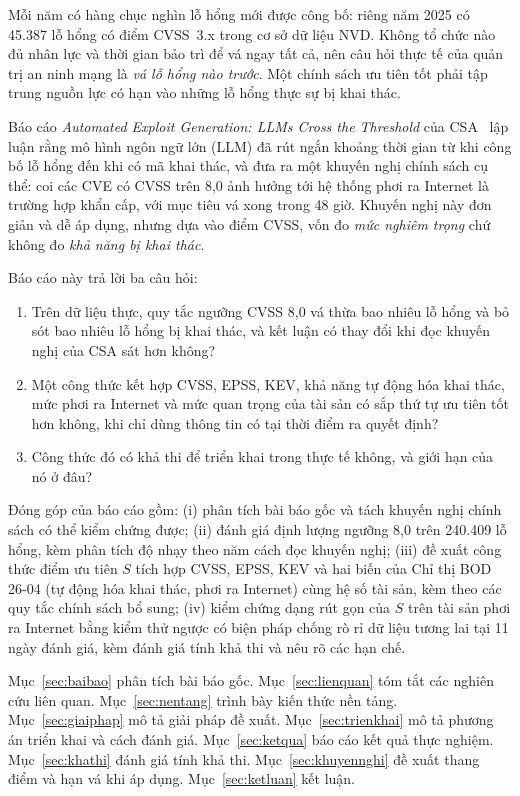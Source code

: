 \documentclass[runningheads]{llncs}
\begin{document}
Mỗi năm có hàng chục nghìn lỗ hổng mới được công bố: riêng năm 2025 có 45.387 lỗ hổng
có điểm CVSS~3.x trong cơ sở dữ liệu NVD. Không tổ chức nào đủ nhân lực và thời gian bảo
trì để vá ngay tất cả, nên câu hỏi thực tế của quản trị an ninh mạng là \emph{vá lỗ hổng
nào trước}. Một chính sách ưu tiên tốt phải tập trung nguồn lực có hạn vào những lỗ hổng
thực sự bị khai thác.

Báo cáo \emph{Automated Exploit Generation: LLMs Cross the Threshold} của
CSA~\cite{csa2026} lập luận rằng mô hình ngôn ngữ lớn (LLM) đã rút ngắn khoảng thời gian
từ khi công bố lỗ hổng đến khi có mã khai thác, và đưa ra một khuyến nghị chính sách cụ
thể: coi các CVE có CVSS trên 8,0 ảnh hưởng tới hệ thống phơi ra Internet là trường hợp
khẩn cấp, với mục tiêu vá xong trong 48 giờ. Khuyến nghị này đơn giản và dễ áp dụng, nhưng
dựa vào điểm CVSS, vốn đo \emph{mức nghiêm trọng} chứ không đo \emph{khả năng bị khai thác}.

Báo cáo này trả lời ba câu hỏi:
\begin{enumerate}
\item[\textbf{CH1.}] Trên dữ liệu thực, quy tắc ngưỡng CVSS 8,0 vá thừa bao nhiêu lỗ hổng và bỏ sót bao nhiêu lỗ hổng bị khai thác, và kết luận có thay đổi khi đọc khuyến nghị của CSA sát hơn không?
\item[\textbf{CH2.}] Một công thức kết hợp CVSS, EPSS, KEV, khả năng tự động hóa khai thác, mức phơi ra Internet và mức quan trọng của tài sản có sắp thứ tự ưu tiên tốt hơn không, khi chỉ dùng thông tin có tại thời điểm ra quyết định?
\item[\textbf{CH3.}] Công thức đó có khả thi để triển khai trong thực tế không, và giới hạn của nó ở đâu?
\end{enumerate}

\noindent Đóng góp của báo cáo gồm: (i) phân tích bài báo gốc và tách khuyến nghị chính sách
có thể kiểm chứng được; (ii) đánh giá định lượng ngưỡng 8,0 trên 240.409 lỗ hổng, kèm phân
tích độ nhạy theo năm cách đọc khuyến nghị; (iii) đề xuất công thức điểm ưu tiên $S$ tích hợp CVSS, EPSS, KEV và hai biến của Chỉ thị BOD 26-04 (tự động hóa khai thác, phơi ra Internet) cùng hệ số tài sản, kèm theo các quy tắc chính sách bổ sung; (iv) kiểm chứng dạng rút gọn của $S$ trên tài sản phơi ra Internet bằng kiểm thử ngược có biện pháp chống rò rỉ
dữ liệu tương lai tại 11 ngày đánh giá, kèm đánh giá tính khả thi và nêu rõ các hạn chế.

Mục~\ref{sec:baibao} phân tích bài báo gốc. Mục~\ref{sec:lienquan} tóm tắt các nghiên
cứu liên quan. Mục~\ref{sec:nentang} trình bày kiến thức nền tảng. Mục~\ref{sec:giaiphap}
mô tả giải pháp đề xuất. Mục~\ref{sec:trienkhai} mô tả phương án triển khai và cách đánh
giá. Mục~\ref{sec:ketqua} báo cáo kết quả thực nghiệm. Mục~\ref{sec:khathi} đánh giá tính
khả thi. Mục~\ref{sec:khuyennghi} đề xuất thang điểm và hạn vá khi áp dụng. Mục~\ref{sec:ketluan} kết luận.
\end{document}
